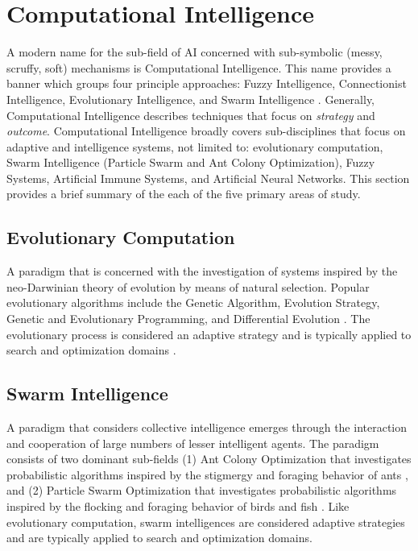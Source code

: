 \documentclass[a4paper, 11pt]{article}
\begin{document}
% 
% 
\section{Computational Intelligence}
\label{sec:computationl_intelligence}
A modern name for the sub-field of AI concerned with sub-symbolic (messy, scruffy, soft) mechanisms is Computational Intelligence. This name provides a banner which groups four principle approaches: Fuzzy Intelligence, Connectionist Intelligence, Evolutionary Intelligence, and Swarm Intelligence \cite{Engelbrecht2007, Pedrycz1997}. Generally, Computational Intelligence describes techniques that focus on \emph{strategy} and \emph{outcome}. 
Computational Intelligence broadly covers sub-disciplines that focus on adaptive and intelligence systems, not limited to: evolutionary computation, Swarm Intelligence (Particle Swarm and Ant Colony Optimization), Fuzzy Systems, Artificial Immune Systems, and Artificial Neural Networks. This section provides a brief summary of the each of the five primary areas of study.

\subsection{Evolutionary Computation} 
A paradigm that is concerned with the investigation of systems inspired by the neo-Darwinian theory of evolution by means of natural selection. Popular evolutionary algorithms include the Genetic Algorithm, Evolution Strategy, Genetic and Evolutionary Programming, and Differential Evolution \cite{Baeck2000, Baeck2000a}. The evolutionary process is considered an adaptive strategy and is typically applied to search and optimization domains \cite{Goldberg1989, Holland1975}.

\subsection{Swarm Intelligence} 
A paradigm that considers collective intelligence emerges through the interaction and cooperation of large numbers of lesser intelligent agents. The paradigm consists of two dominant sub-fields (1) Ant Colony Optimization that investigates probabilistic algorithms inspired by the stigmergy and foraging behavior of ants \cite{Bonabeau1999, Dorigo2004}, and (2) Particle Swarm Optimization that investigates probabilistic algorithms inspired by the flocking and foraging behavior of birds and fish \cite{Shi2001}. Like evolutionary computation, swarm intelligences are considered adaptive strategies and are typically applied to search and optimization domains.
\end{document}
